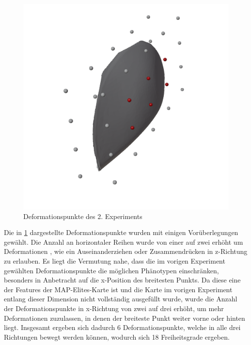 \begin{figure}[h]
	\centering
	\includegraphics[width=.7\linewidth]{bilder/6ptDeformationPoints}
	\caption{Deformationspunkte des 2. Experiments}
	\label{fig:ffd2nd}
\end{figure}
Die in \cref{fig:ffd2nd} dargestellte Deformationspunkte wurden mit einigen Vorüberlegungen gewählt.
Die Anzahl an horizontaler Reihen wurde von einer auf zwei erhöht um Deformationen , wie ein Auseinanderziehen oder Zusammendrücken in z-Richtung zu erlauben.
Es liegt die Vermutung nahe, dass die im vorigen Experiment gewählten Deformationspunkte die möglichen Phänotypen einschränken, besonders in Anbetracht auf die x-Position des breitesten Punkts.
Da diese eine der Features der MAP-Elites-Karte ist und die Karte im vorigen Experiment entlang dieser Dimension nicht vollständig ausgefüllt wurde, wurde die Anzahl der Deformationspunkte in x-Richtung von zwei auf drei erhöht, um mehr Deformationen zuzulassen, in denen der breiteste Punkt weiter vorne oder hinten liegt.
Insgesamt ergeben sich dadurch 6 Deformationspunkte, welche in alle drei Richtungen bewegt werden können, wodurch sich 18 Freiheitsgrade ergeben.

